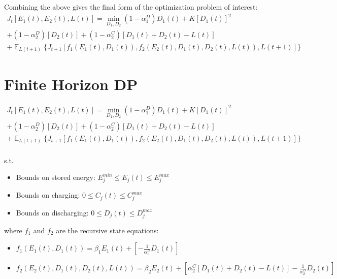 \documentclass{article}
\DeclareMathOperator{\E}{\mathbb{E}}
\begin{document}
	
	Combining the above gives the final form of the optimization problem of interest:
	\begin{multline}
	J_{t}[E_{1}(t),E_{2}(t),L(t)] = \min_{D_{1},D_{2}}
	(1-\alpha_{1}^{D})D_{1}(t) 
	+ K[D_{1}(t)]^{2}\\
	+(1-\alpha_{2}^{D})[D_{2}(t)]	  +(1-\alpha_{2}^{C})[D_{1}(t)+D_{2}(t)-L(t)]\\
	+\mathop{\E}_{L(t+1)}\{J_{t+1}[f_{1}(E_{1}(t),D_{1}(t)), f_{2}(E_{2}(t),D_{1}(t),D_{2}(t),L(t)), L(t+1)]\}
	\end{multline}
	
	
	
	\section{Finite Horizon DP}
	\begin{multline}
	J_{t}[E_{1}(t),E_{2}(t),L(t)] = \min_{D_{1},D_{2}}
	(1-\alpha_{1}^{D})D_{1}(t) 
	+ K[D_{1}(t)]^{2}\\
	+(1-\alpha_{2}^{D})[D_{2}(t)]	  +(1-\alpha_{2}^{C})[D_{1}(t)+D_{2}(t)-L(t)]\\
	+\mathop{\E}_{L(t+1)}\{J_{t+1}[f_{1}(E_{1}(t),D_{1}(t)), f_{2}(E_{2}(t),D_{1}(t),D_{2}(t),L(t)), L(t+1)]\}
	\end{multline}
	\\
	s.t. 
	\begin{itemize}
		\item Bounds on stored energy: 
		\begin{math}E_{j}^{min}\leq E_{j}(t)\leq E_{j}^{max}\end{math}
		\item Bounds on charging:
		\begin{math}0\leq C_{j}(t)\leq C_{j}^{max}\end{math}
		\item Bounds on discharging:
		\begin{math}0\leq D_{j}(t)\leq D_{j}^{max}\end{math}
	\end{itemize}
	where $f_{1}$ and $f_{2}$ are the recursive state equations:\\
	\begin{itemize}
		\item \begin{math}f_{1}(E_{1}(t),D_{1}(t))=\beta_{1}E_{1}(t)+\left[-\frac{1}{\alpha_{1}^{D}}D_{1}(t)\right]\end{math}\\
		\item \begin{math}f_{2}(E_{2}(t),D_{1}(t),D_{2}(t),L(t))=\beta_{2}E_{2}(t)+\left[\alpha_{2}^{C}[D_{1}(t)+D_{2}(t)-L(t)]-\frac{1}{\alpha_{2}^{D}}D_{2}(t)\right]\end{math}
	\end{itemize}
	
\end{document}
